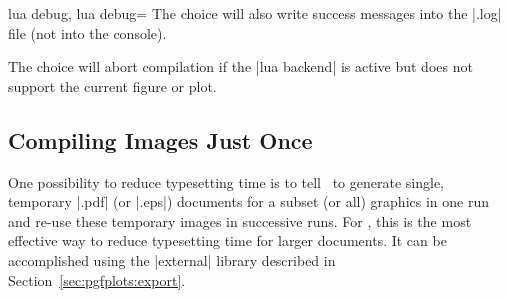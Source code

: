 {\begin{pgfplotskeylist}{lua debug, lua debug=}
	The choice  will also write success messages into the |.log| file (not into the console).

	The choice  will abort compilation if the |lua backend| is active but does not support the current figure or plot.
\end{pgfplotskeylist}

\subsection{Compiling Images Just Once}
One possibility to reduce typesetting time is to tell \PGF\ to generate single, temporary |.pdf| (or |.eps|) documents for a subset (or all) graphics in one run and re-use these temporary images in successive runs. For \PGFPlots, this is the most effective way to reduce typesetting time for larger documents. It can be accomplished using the |external| library described in Section~\ref{sec:pgfplots:export}.
}
